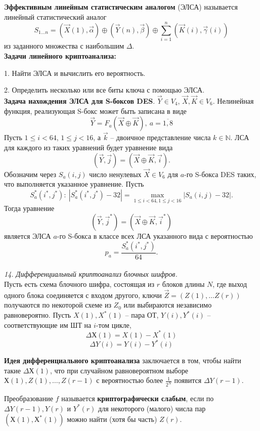 \textbf{Эффективным линейным статистическим аналогом} (ЭЛСА) называется линейный статистический аналог
$$S_{1 \ldots n} = (\vec X(1), \vec \alpha) \oplus (\vec Y(n), \vec \beta) \oplus \sum_{i=1}^n (\vec K(i), \vec \gamma (i))$$
из заданного множества с наибольшим $\Delta$. \\

\noindent \textbf{Задачи линейного криптоанализа:}

1. Найти ЭЛСА и вычислить его вероятность.

2. Определить несколько или все биты ключа с помощью ЭЛСА. \\

\noindent \textbf{Задача нахождения ЭЛСА для S-боксов DES}.
$\vec Y \in V_4$, $\vec X, \vec K \in V_6$. Нелинейная функция, реализующая S-бокс может быть записана в виде
$$\vec Y = F_a (\vec X \oplus \vec K),\ a = \overline {1, 8}$$
Пусть $1 \le i < 64$, $1 \le j < 16$, а $\vec k$ -- двоичное представление числа $k \in \mathbb N$. ЛСА для каждого из таких уравнений будет уравнение вида
$$(\vec Y, \vec j) = (\vec X \oplus \vec K, \vec i).$$
Обозначим через $S_a(i, j)$ число ненулевых $\vec X \in V_6$ для $a$-го S-бокса DES таких, что выполняется указанное уравнение. Пусть
$$S^*_a(i^*, j^*):\ |S^*_a(i^*, j^*) - 32| = \underset{1 \le i < 64, 1 \le j < 16}{\max} |S_a(i, j) - 32|.$$
Тогда уравнение
$$(\vec Y, \vec j^*) = (\vec X \oplus \vec K, \vec i^*)$$
является ЭЛСА $a$-го S-бокса в классе всех ЛСА указанного вида с вероятностью
$$p_a = \frac{S^*_a(i^*, j^*)}{64}.$$ \\

\noindent \textit{14. Дифференциальный криптоанализ блочных шифров.} \\

Пусть есть схема блочного шифра, состоящая из $r$ блоков длины $N$, где выход одного блока соединяется с входом другого, ключи $\vec Z = (Z(1), \ldots Z(r))$ получаются по некоторой схеме из $Z_0$ или выбираются независимо равновероятно.
Пусть $X(1), X^*(1)$ -- пара ОТ, $Y(i), Y^*(i)$ -- соответствующие им ШТ на $i$-том цикле,
$$\Delta Х(1) = X(1) - X^*(1)$$
$$\Delta Y(i) = Y(i) - Y^*(i)$$

\textbf{Идея дифференциального криптоанализа} заключается в том, чтобы найти такие $\Delta Х(1)$, что при случайном равновероятном выборе $Х(1), Z(1), \ldots, Z(r-1)$ с вероятностью более $\frac{1}{2^N}$ появится $\Delta Y( r-1)$.

Преобразование $f$ называется \textbf{криптографически
слабым}, если по $\Delta Y(r-1), Y(r)$ и $Y^* (r)$ для некоторого (малого) числа пар $(Х(1), Х^* (1))$ можно найти (хотя бы часть) $Z(r)$.

